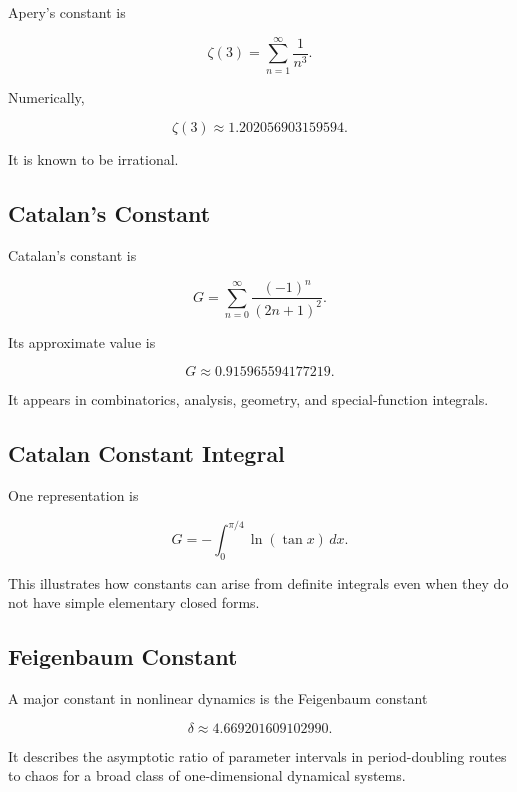 Apery's constant is

\[
\boxed{
\zeta(3)
=
\sum_{n=1}^{\infty}
\frac{1}{n^3}.
}
\]

Numerically,

\[
\boxed{
\zeta(3)
\approx
1.202056903159594.
}
\]

It is known to be irrational.

\subsection{Catalan's Constant}
\label{subsec:catalan-constant-reference}

Catalan's constant is

\[
\boxed{
G
=
\sum_{n=0}^{\infty}
\frac{(-1)^n}{(2n+1)^2}.
}
\]

Its approximate value is

\[
\boxed{
G
\approx
0.915965594177219.
}
\]

It appears in combinatorics, analysis, geometry, and special-function
integrals.

\subsection{Catalan Constant Integral}
\label{subsec:catalan-integral-reference}

One representation is

\[
\boxed{
G
=
-\int_0^{\pi/4}
\ln(\tan x)\,dx.
}
\]

This illustrates how constants can arise from definite integrals even when
they do not have simple elementary closed forms.

\subsection{Feigenbaum Constant}
\label{subsec:feigenbaum-constant-reference}

A major constant in nonlinear dynamics is the Feigenbaum constant

\[
\boxed{
\delta
\approx
4.669201609102990.
}
\]

It describes the asymptotic ratio of parameter intervals in period-doubling
routes to chaos for a broad class of one-dimensional dynamical systems.

